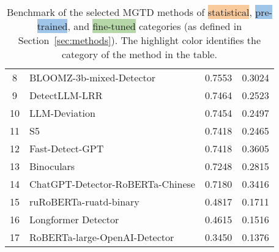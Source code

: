 \documentclass[letterpaper]{article} %
\begin{document}
\begin{table}[!t]
{\begin{tabular}{cm{6cm}@{}cc}
{\cellcolor[HTML]{9FC5E8}} 8 & {\cellcolor[HTML]{9FC5E8}} BLOOMZ-3b-mixed-Detector & {\cellcolor[HTML]{9FC5E8}} 0.7553 & {\cellcolor[HTML]{9FC5E8}} 0.3024 \\
{\cellcolor[HTML]{F9CB9C}} 9 & {\cellcolor[HTML]{F9CB9C}} DetectLLM-LRR & {\cellcolor[HTML]{F9CB9C}} 0.7464 & {\cellcolor[HTML]{F9CB9C}} 0.2523 \\
{\cellcolor[HTML]{F9CB9C}} 10 & {\cellcolor[HTML]{F9CB9C}} LLM-Deviation & {\cellcolor[HTML]{F9CB9C}} 0.7454 & {\cellcolor[HTML]{F9CB9C}} 0.2497 \\
{\cellcolor[HTML]{F9CB9C}} 11 & {\cellcolor[HTML]{F9CB9C}} S5 & {\cellcolor[HTML]{F9CB9C}} 0.7418 & {\cellcolor[HTML]{F9CB9C}} 0.2465 \\
{\cellcolor[HTML]{F9CB9C}} 12 & {\cellcolor[HTML]{F9CB9C}} Fast-Detect-GPT & {\cellcolor[HTML]{F9CB9C}} 0.7418 & {\cellcolor[HTML]{F9CB9C}} 0.3605 \\
{\cellcolor[HTML]{F9CB9C}} 13 & {\cellcolor[HTML]{F9CB9C}} Binoculars & {\cellcolor[HTML]{F9CB9C}} 0.7248 & {\cellcolor[HTML]{F9CB9C}} 0.2815 \\
{\cellcolor[HTML]{9FC5E8}} 14 & {\cellcolor[HTML]{9FC5E8}} ChatGPT-Detector-RoBERTa-Chinese & {\cellcolor[HTML]{9FC5E8}} 0.7180 & {\cellcolor[HTML]{9FC5E8}} 0.3416 \\
{\cellcolor[HTML]{9FC5E8}} 15 & {\cellcolor[HTML]{9FC5E8}} ruRoBERTa-ruatd-binary & {\cellcolor[HTML]{9FC5E8}} 0.4817 & {\cellcolor[HTML]{9FC5E8}} 0.1711 \\
{\cellcolor[HTML]{9FC5E8}} 16 & {\cellcolor[HTML]{9FC5E8}} Longformer Detector & {\cellcolor[HTML]{9FC5E8}} 0.4615 & {\cellcolor[HTML]{9FC5E8}} 0.1516 \\
{\cellcolor[HTML]{9FC5E8}} 17 & {\cellcolor[HTML]{9FC5E8}} RoBERTa-large-OpenAI-Detector & {\cellcolor[HTML]{9FC5E8}} 0.3450 & {\cellcolor[HTML]{9FC5E8}} 0.1376 \\
\hline
\end{tabular}
}
\caption{Benchmark of the selected MGTD methods of \colorbox[HTML]{F9CB9C}{statistical}, \colorbox[HTML]{9FC5E8}{pre-trained}, and \colorbox[HTML]{B6D7A8}{fine-tuned} categories (as defined in Section~\ref{sec:methods}). The highlight color identifies the category of the method in the table.}
\label{tab:benchmark}
\end{table}
\end{document}
